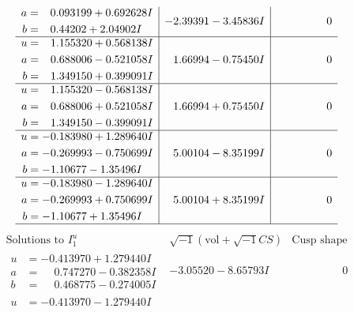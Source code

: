 \documentclass[1p]{elsarticle_modified}
\theoremstyle{definition}
\newcommand{\I}{\sqrt{-1}}
\begin{document}
$$\begin{array}{c|c|c}
\begin{aligned}
a &= \phantom{-}0.093199 + 0.692628 I \\
b &= \phantom{-}0.44202 + 2.04902 I\end{aligned}
 & -2.39391 - 3.45836 I & \phantom{-0.000000 } 0 \\ \hline\begin{aligned}
u &= \phantom{-}1.155320 + 0.568138 I \\
a &= \phantom{-}0.688006 - 0.521058 I \\
b &= \phantom{-}1.349150 + 0.399091 I\end{aligned}
 & \phantom{-}1.66994 - 0.75450 I & \phantom{-0.000000 } 0 \\ \hline\begin{aligned}
u &= \phantom{-}1.155320 - 0.568138 I \\
a &= \phantom{-}0.688006 + 0.521058 I \\
b &= \phantom{-}1.349150 - 0.399091 I\end{aligned}
 & \phantom{-}1.66994 + 0.75450 I & \phantom{-0.000000 } 0 \\ \hline\begin{aligned}
u &= -0.183980 + 1.289640 I \\
a &= -0.269993 - 0.750699 I \\
b &= -1.10677 - 1.35496 I\end{aligned}
 & \phantom{-}5.00104 - 8.35199 I & \phantom{-0.000000 } 0 \\ \hline\begin{aligned}
u &= -0.183980 - 1.289640 I \\
a &= -0.269993 + 0.750699 I \\
b &= -1.10677 + 1.35496 I\end{aligned}
 & \phantom{-}5.00104 + 8.35199 I & \phantom{-0.000000 } 0\\
 \hline 
 \end{array}$$\newpage$$\begin{array}{c|c|c}  
\text{Solutions to }I^u_{1}& \I (\text{vol} + \sqrt{-1}CS) & \text{Cusp shape}\\
 \hline 
\begin{aligned}
u &= -0.413970 + 1.279440 I \\
a &= \phantom{-}0.747270 - 0.382358 I \\
b &= \phantom{-}0.468775 - 0.274005 I\end{aligned}
 & -3.05520 - 8.65793 I & \phantom{-0.000000 } 0 \\ \hline\begin{aligned}
u &= -0.413970 - 1.279440 I \\

\end{aligned}
\end{array}$$
\end{document}
